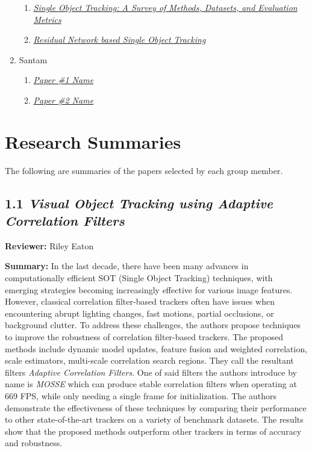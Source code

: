 \documentclass{article}
\begin{document}
\begin{enumerate}
\begin{enumerate}[label*=\arabic*.]
      \item \textit{\href{https://arxiv.org/abs/2201.13066}{Single Object Tracking: A Survey of Methods, Datasets, and Evaluation Metrics}}
      \item \textit{\href{https://ieeexplore.ieee.org/document/9774086}{Residual Network based Single Object Tracking}}
    \end{enumerate}
  \item Santam
    \begin{enumerate}[label*=\arabic*.]
      \item \textit{\href{paper_link_here}{Paper \#1 Name}}
      \item \textit{\href{paper_link_here}{Paper \#2 Name}}
    \end{enumerate}
\end{enumerate}

\section*{Research Summaries}

The following are summaries of the papers selected by each group member.

\subsection*{1.1 \textit{Visual Object Tracking using Adaptive Correlation Filters}}

\hspace*{\parindent}\textbf{Reviewer:} Riley Eaton

\vspace{0.3cm}

\textbf{Summary:} In the last decade, there have been many advances in computationally efficient SOT (Single Object Tracking) techniques, with emerging strategies becoming increasingly effective for various image features. However, classical correlation filter-based trackers often have issues when encountering abrupt lighting changes, fast motions, partial occlusions, or background clutter. To address these challenges, the authors propose techniques to improve the robustness of correlation filter-based trackers. The proposed methods include dynamic model updates, feature fusion and weighted correlation, scale estimators, multi-scale correlation search regions. They call the resultant filters \emph{Adaptive Correlation Filters}. One of said filters the authors introduce by name is \emph{MOSSE} which can produce stable correlation filters when operating at 669 FPS, while only needing a single frame for initialization. The authors demonstrate the effectiveness of these techniques by comparing their performance to other state-of-the-art trackers on a variety of benchmark datasets. The results show that the proposed methods outperform other trackers in terms of accuracy and robustness.
\end{document}
